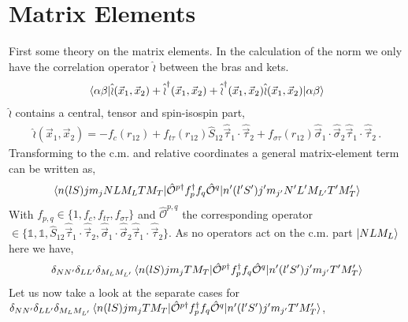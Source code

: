 \documentclass[10pt]{article}
\begin{document}
\section{Matrix Elements}
First some theory on the matrix elements. In the calculation of the norm we only have the correlation operator $\hat{\wr}$ between the bras and kets.
\begin{align}\label{eq:norm}
	\braket{ \alpha \beta |\hat{\wr}(\vec{x}_{1},\vec{x}_{2}) + \hat{\wr}^{\dagger}(\vec{x}_{1},\vec{x}_{2}) + \hat{\wr}^{\dagger}(\vec{x}_{1},\vec{x}_{2})\hat{\wr}(\vec{x}_{1},\vec{x}_{2}) | \alpha \beta}
\end{align}
$\hat{\wr}$ contains a central, tensor and spin-isospin part,
\begin{align*}
	\hat{\wr}(\vec{x}_{1},\vec{x}_{2}) = -f_c(r_{12}) + f_{t\tau}(r_{12}) \hat{S}_{12} \hat{\vec{\tau}}_{1} \cdot \hat{\vec{\tau}}_{2} + f_{\sigma \tau}(r_{12}) \hat{ \vec{\sigma}}_{1} \cdot \hat{ \vec{\sigma}}_{2} \hat{ \vec{\tau}}_{1} \cdot \hat{ \vec{\tau}}_{2}  \, .
\end{align*}
Transforming to the c.m. and relative coordinates a general matrix-element term can be written as,
\begin{align*}
	\braket{ n (l S) j m_j N L M_L T M_T |  \hat{\mathcal{O}}^{p\dagger} 
f^{\dagger}_{p} f_{q} \hat{\mathcal{O}}^{q} | n' (l' S') j' m_{j'} N' L' M_{L'} 
T' M_T'} 
\end{align*}
With $f_{p,q} \in \{ 1, f_{c}, f_{t\tau}, f_{\sigma \tau} \}$ and 
$\hat{\mathcal{O}}^{p,q}$ the corresponding operator $\in \{ \mathbb{1}, 
\mathbb{1},  \hat{S}_{12} \hat{\vec{\tau}}_{1} \cdot \hat{\vec{\tau}}_{2}, 
\hat{ \vec{\sigma}}_{1} \cdot \hat{ \vec{\sigma}}_{2} \hat{ \vec{\tau}}_{1} 
\cdot \hat{ \vec{\tau}}_{2} \} $.
As no operators act on the c.m. part $ \ket{ N L M_L}$ here we have,
\begin{align*}
	\delta_{NN'} \delta_{LL'} \delta_{M_L M_{L'}} \braket{ n (l S) j m_j T 
M_T |  \hat{\mathcal{O}}^{p\dagger} f^{\dagger}_{p} f_{q} \hat{\mathcal{O}}^{q} 
| n' (l' S') j' m_{j'} T' M_T'}  
\end{align*}
Let us now take a look at the separate cases for $\delta_{NN'} \delta_{LL'} 
\delta_{M_L M_{L'}} \braket{ n (l S) j m_j T M_T |  
\hat{\mathcal{O}}^{p\dagger} f^{\dagger}_{p} f_{q} \hat{\mathcal{O}}^{q} | n' 
(l' S') j' m_{j'} T' M_T'} $,
\end{document}
